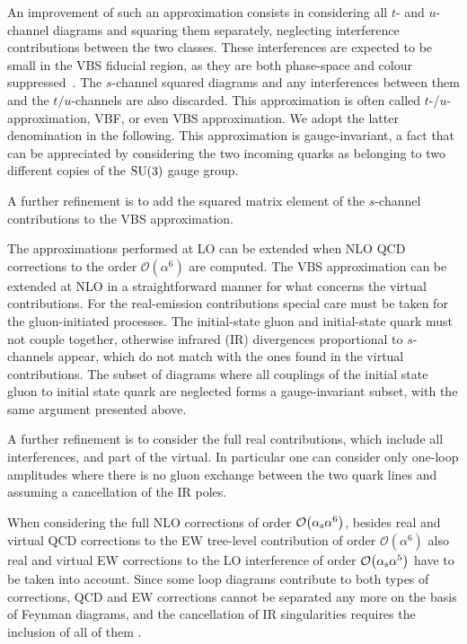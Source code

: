 \documentclass[twocolumn,epjc3]{svjour3} %
\begin{document}
    An improvement of such an approximation consists 
    in considering all $t$- and $u$-channel diagrams and squaring them separately, neglecting interference contributions between the two classes.
    These interferences are expected to be small in the VBS fiducial region, as they are both phase-space and colour suppressed~\cite{Oleari:2003tc,Denner:2012dz}.
    The $s$-channel squared diagrams and any interferences between them and the  $t/u$-channels are also discarded.
    This approximation is often called $t$-/$u$- approximation, VBF, or even VBS approximation.
    We adopt the latter denomination in the following.
    This approximation is gauge-invariant, a fact that can be appreciated by considering the two incoming quarks as belonging to two different copies of the $\rm{SU}(3)$ gauge group.

    A further refinement is to add the squared matrix element of the $s$-channel contributions to the VBS approximation.

    The approximations performed at LO can be extended when NLO QCD corrections to the order $\mathcal{O}{\left(\alpha^{6}\right)}$ are computed.
    The VBS approximation can be extended at NLO in a straightforward manner for what concerns the virtual contributions.
    For the real-emission contributions special care must be taken for the gluon-initiated processes.
    The initial-state gluon and initial-state quark 
        must not couple together, otherwise infrared (IR) divergences proportional to $s$-channels appear, 
         which do not match with the ones found in the virtual contributions.
         The subset of diagrams where all couplings of the initial state gluon to initial state quark are neglected forms a gauge-invariant subset, with the same argument presented above.

    A further refinement is to consider the full real contributions, which include all interferences, and part of the virtual.
    In particular one can consider only one-loop amplitudes where there is no gluon exchange between the two quark lines and 
    assuming a cancellation of the IR poles.

    When considering the full NLO corrections of order $\mathcal{O}{\left(\alpha_{\rm s}\alpha^{6}\right)}$, besides real and virtual QCD corrections
    to the EW tree-level contribution of order
    $\mathcal{O}{\left(\alpha^{6}\right)}$
    also real and virtual EW corrections to the LO interference
    of order $\mathcal{O}{\left(\alpha_{\rm s}\alpha^{5}\right)}$
    have to be taken into account. Since some loop diagrams contribute
    to both types of corrections, QCD and EW corrections cannot be
    separated any more on the basis of Feynman diagrams, and the
    cancellation of IR singularities requires the inclusion of all of them \cite{Biedermann:2017bss}.
\end{document}
